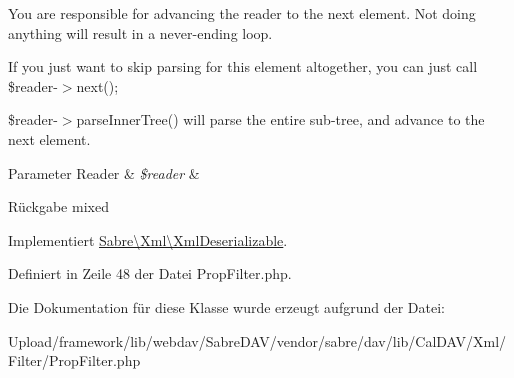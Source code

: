 You are responsible for advancing the reader to the next element. Not doing anything will result in a never-\/ending loop.

If you just want to skip parsing for this element altogether, you can just call \$reader-\/$>$next();

\$reader-\/$>$parse\+Inner\+Tree() will parse the entire sub-\/tree, and advance to the next element.


\begin{DoxyParams}[1]{Parameter}
Reader & {\em \$reader} & \\
\hline
\end{DoxyParams}
\begin{DoxyReturn}{Rückgabe}
mixed 
\end{DoxyReturn}


Implementiert \mbox{\hyperlink{interface_sabre_1_1_xml_1_1_xml_deserializable_a19e0eca545b9a0d93f7d6b69085ade30}{Sabre\textbackslash{}\+Xml\textbackslash{}\+Xml\+Deserializable}}.



Definiert in Zeile 48 der Datei Prop\+Filter.\+php.



Die Dokumentation für diese Klasse wurde erzeugt aufgrund der Datei\+:\begin{DoxyCompactItemize}
\item 
Upload/framework/lib/webdav/\+Sabre\+D\+A\+V/vendor/sabre/dav/lib/\+Cal\+D\+A\+V/\+Xml/\+Filter/Prop\+Filter.\+php\end{DoxyCompactItemize}
